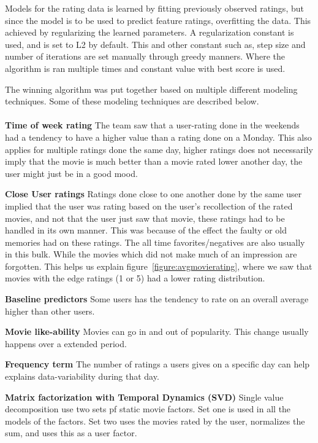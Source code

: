 Models for the rating data is learned by fitting previously observed ratings, but since the model is to be used to predict feature ratings, overfitting the data. This achieved by regularizing the learned parameters. A regularization constant is used, and is set to L2 by default. This and other constant such as, step size and number of iterations are set manually through greedy manners. Where the algorithm is ran multiple times and constant value with best score is used. \cite{BellKor-CF-TD}

The winning algorithm was put together based on multiple different modeling techniques. Some of these modeling techniques are described below. \\\\


\textbf{Time of week rating}  The team saw that a user-rating done in the weekends had a tendency to have a higher value than a rating done on a Monday. This also applies for multiple ratings done the same day, higher ratings does not necessarily imply that the movie is much better than a movie rated lower another day, the user might just be in a good mood.

\textbf{Close User ratings}  Ratings done close to one another done by the same user implied that the user was rating based on the user's recollection of the rated movies, and not that the user just saw that movie, these ratings had to be handled in its own manner. This was because of the effect the faulty or old memories had on these ratings. The all time favorites/negatives are also usually in this bulk. While the movies which did not make much of an impression are forgotten. This helps us explain figure~\ref{figure:avgmovierating}, where we saw that movies with the edge ratings (1 or 5) had a lower rating distribution.

\textbf{Baseline predictors}  Some users has the tendency to rate on an overall average higher than other users.

\textbf{Movie like-ability}  Movies can go in and out of popularity. This change usually happens over a extended period.

\textbf{Frequency term}  The number of ratings a users gives on a specific day can help explains data-variability during that day.

\textbf{Matrix factorization with Temporal Dynamics (SVD)}  Single value decomposition use two sets pf static movie factors. Set one is used in all the models of the factors. Set two uses the movies rated by the user, normalizes the sum, and uses this as a user factor.

